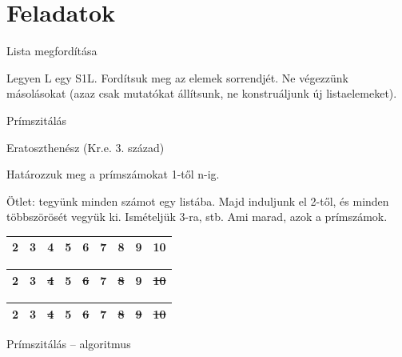 \documentclass[hungarian]{beamer}
\begin{document}
\section{Feladatok}

\begin{frame}[t]{Lista megfordítása}

Legyen L egy S1L. Fordítsuk meg az elemek sorrendjét. Ne végezzünk másolásokat (azaz csak mutatókat állítsunk, ne konstruáljunk új listaelemeket).



\end{frame}

\begin{frame}{Prímszitálás}

Eratoszthenész (Kr.e. 3. század)

Határozzuk meg a prímszámokat 1-től n-ig.

Ötlet: tegyünk minden számot egy listába. Majd induljunk el 2-től, és minden többszörösét vegyük ki. Ismételjük 3-ra, stb. Ami marad, azok a prímszámok.

\vspace{5mm}

\begin{tabular}{|c|c|c|c|c|c|c|c|c|}
    \hline
    2 & 3 & 4 & 5 & 6 & 7 & 8 & 9 & 10 \\
    \hline
\end{tabular}

\begin{tabular}{|c|c|c|c|c|c|c|c|c|}
    \hline
    2 & 3 & \st{4} & 5 & \st{6} & 7 & \st{8} & 9 & \st{10} \\
    \hline
\end{tabular}

\begin{tabular}{|c|c|c|c|c|c|c|c|c|}
    \hline
    \textbf{2} & \textbf{3} & \st{4} & \textbf{5} & \st{6} & \textbf{7} & \st{8} & \st{9} & \st{10} \\
    \hline
\end{tabular}
    
\end{frame}

\begin{frame}{Prímszitálás -- algoritmus}

\end{frame}
\end{document}
